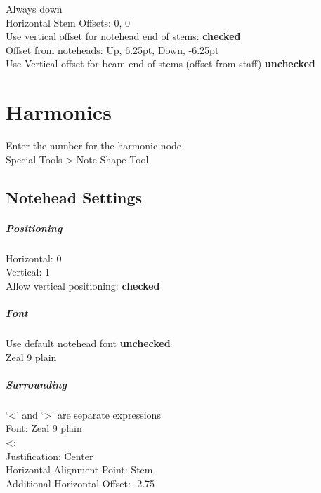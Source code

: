 \documentclass[]{memoir}
\begin{document}
Always down\\
Horizontal Stem Offsets: 0, 0\\
Use vertical offset for notehead end of stems: \textbf{checked}\\
Offset from noteheads: Up, 6.25pt, Down, -6.25pt\\
Use Vertical offset for beam end of stems (offset from staff) \textbf{unchecked}\\


\chapter{Harmonics}
\label{sec:harmonics}

Enter the number for the harmonic node\\
Special Tools > Note Shape Tool\\

\section{Notehead Settings}
\label{sec:notehead-settings}

\paragraph{Positioning}
\label{sec:positioning}

Horizontal: 0\\
Vertical: 1\\
Allow vertical positioning: \textbf{checked}

\paragraph{Font}
\label{sec:font}

Use default notehead font \textbf{unchecked}\\
Zeal 9 plain

\paragraph{Surrounding}
\label{sec:surrounding}

`<' and `>' are separate expressions\\
Font: Zeal 9 plain\\

<:\\
\indent Justification: Center\\
\indent Horizontal Alignment Point: Stem\\
\indent Additional Horizontal Offset: -2.75\\
\end{document}

